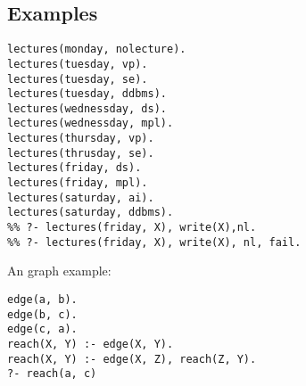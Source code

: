 \subsection{Examples}
\begin{lstlisting}
lectures(monday, nolecture).
lectures(tuesday, vp).
lectures(tuesday, se).
lectures(tuesday, ddbms).
lectures(wednessday, ds).
lectures(wednessday, mpl).
lectures(thursday, vp).
lectures(thrusday, se).
lectures(friday, ds).
lectures(friday, mpl).
lectures(saturday, ai).
lectures(saturday, ddbms).
%% ?- lectures(friday, X), write(X),nl.
%% ?- lectures(friday, X), write(X), nl, fail.
\end{lstlisting}

An graph example:
\begin{lstlisting}
edge(a, b).
edge(b, c).
edge(c, a).
reach(X, Y) :- edge(X, Y).
reach(X, Y) :- edge(X, Z), reach(Z, Y).
?- reach(a, c)
\end{lstlisting}



